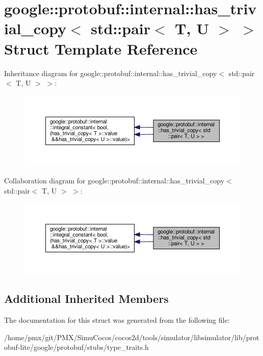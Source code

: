 \hypertarget{structgoogle_1_1protobuf_1_1internal_1_1has__trivial__copy_3_01std_1_1pair_3_01T_00_01U_01_4_01_4}{}\section{google\+:\+:protobuf\+:\+:internal\+:\+:has\+\_\+trivial\+\_\+copy$<$ std\+:\+:pair$<$ T, U $>$ $>$ Struct Template Reference}
\label{structgoogle_1_1protobuf_1_1internal_1_1has__trivial__copy_3_01std_1_1pair_3_01T_00_01U_01_4_01_4}


Inheritance diagram for google\+:\+:protobuf\+:\+:internal\+:\+:has\+\_\+trivial\+\_\+copy$<$ std\+:\+:pair$<$ T, U $>$ $>$\+:
\nopagebreak
\begin{figure}[H]
\begin{center}
\leavevmode
\includegraphics[width=350pt]{structgoogle_1_1protobuf_1_1internal_1_1has__trivial__copy_3_01std_1_1pair_3_01T_00_01U_01_4_01_4__inherit__graph}
\end{center}
\end{figure}


Collaboration diagram for google\+:\+:protobuf\+:\+:internal\+:\+:has\+\_\+trivial\+\_\+copy$<$ std\+:\+:pair$<$ T, U $>$ $>$\+:
\nopagebreak
\begin{figure}[H]
\begin{center}
\leavevmode
\includegraphics[width=350pt]{structgoogle_1_1protobuf_1_1internal_1_1has__trivial__copy_3_01std_1_1pair_3_01T_00_01U_01_4_01_4__coll__graph}
\end{center}
\end{figure}
\subsection*{Additional Inherited Members}


The documentation for this struct was generated from the following file\+:\begin{DoxyCompactItemize}
\item 
/home/pmx/git/\+P\+M\+X/\+Simu\+Cocos/cocos2d/tools/simulator/libsimulator/lib/protobuf-\/lite/google/protobuf/stubs/type\+\_\+traits.\+h\end{DoxyCompactItemize}
